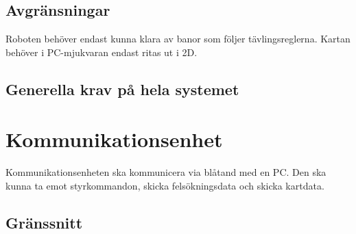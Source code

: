 \documentclass[a4paper,12pt]{article}
\begin{document}

\subsection{Avgränsningar}
Roboten behöver endast kunna klara av banor som följer tävlingsreglerna.
Kartan behöver i PC-mjukvaran endast ritas ut i 2D.


\subsection{Generella krav på hela systemet}

\begin{LIPSkravlista}
\end{LIPSkravlista}


\section{Kommunikationsenhet}

Kommunikationsenheten ska kommunicera via blåtand med en PC. Den ska kunna ta
emot styrkommandon, skicka felsökningsdata och skicka kartdata.

\subsection{Gränssnitt}
\begin{LIPSkravlista}
   
\end{LIPSkravlista}

\end{document}
